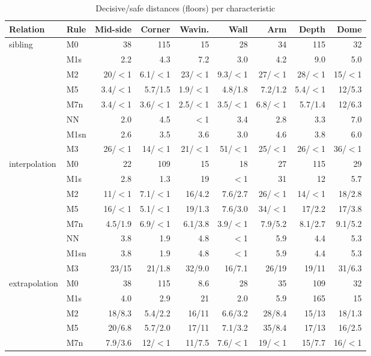\documentclass[pdflatex,sn-basic]{sn-jnl}
\newcommand{\tabsizesmall}{\footnotesize}
\begin{document}
\begin{table}[p]
\tabsizesmall
\setlength{\tabcolsep}{2pt}
\caption{Decisive/safe distances (floors) per characteristic}\label{tab:s-qc}
\begin{tabular}{@{}llrrrrrrr@{}}
\toprule
Relation & Rule & Mid-side & Corner & Wavin. & Wall & Arm & Depth & Dome \\
\midrule
sibling & M0 & 38 & 115 & 15 & 28 & 34 & 115 & 32 \\
 & M1s & 2.2 & 4.3 & 7.2 & 3.0 & 4.2 & 9.0 & 5.0 \\
 & M2 & 20/$<$1 & 6.1/$<$1 & 23/$<$1 & 9.3/$<$1 & 27/$<$1 & 28/$<$1 & 15/$<$1 \\
 & M5 & 3.4/$<$1 & 5.7/1.5 & 1.9/$<$1 & 4.8/1.8 & 7.2/1.2 & 5.4/$<$1 & 12/5.3 \\
 & M7n & 3.4/$<$1 & 3.6/$<$1 & 2.5/$<$1 & 3.5/$<$1 & 6.8/$<$1 & 5.7/1.4 & 12/6.3 \\
 & NN & 2.0 & 4.5 & $<$1 & 3.4 & 2.8 & 3.3 & 7.0 \\
 & M1sn & 2.6 & 3.5 & 3.6 & 3.0 & 4.6 & 3.8 & 6.0 \\
 & M3 & 26/$<$1 & 14/$<$1 & 21/$<$1 & 51/$<$1 & 25/$<$1 & 26/$<$1 & 36/$<$1 \\
interpolation & M0 & 22 & 109 & 15 & 18 & 27 & 115 & 29 \\
 & M1s & 2.8 & 1.3 & 19 & $<$1 & 31 & 12 & 5.7 \\
 & M2 & 11/$<$1 & 7.1/$<$1 & 16/4.2 & 7.6/2.7 & 26/$<$1 & 14/$<$1 & 18/2.8 \\
 & M5 & 16/$<$1 & 5.1/$<$1 & 19/1.3 & 7.6/3.0 & 34/$<$1 & 17/2.2 & 17/3.8 \\
 & M7n & 4.5/1.9 & 6.9/$<$1 & 6.1/3.8 & 3.9/$<$1 & 7.9/5.2 & 8.1/2.7 & 9.1/5.2 \\
 & NN & 3.8 & 1.9 & 4.8 & $<$1 & 5.9 & 4.4 & 5.3 \\
 & M1sn & 3.8 & 1.9 & 4.8 & $<$1 & 5.9 & 4.4 & 5.3 \\
 & M3 & 23/15 & 21/1.8 & 32/9.0 & 16/7.1 & 26/19 & 19/11 & 31/6.3 \\
extrapolation & M0 & 38 & 115 & 8.6 & 28 & 35 & 109 & 32 \\
 & M1s & 4.0 & 2.9 & 21 & 2.0 & 5.9 & 165 & 15 \\
 & M2 & 18/8.3 & 5.4/2.2 & 16/11 & 6.6/3.2 & 28/8.4 & 15/13 & 18/1.3 \\
 & M5 & 20/6.8 & 5.7/2.0 & 17/11 & 7.1/3.2 & 35/8.4 & 17/13 & 16/2.5 \\
 & M7n & 7.9/3.6 & 12/$<$1 & 11/7.5 & 7.6/$<$1 & 19/$<$1 & 15/7.7 & 16/$<$1 \\

\end{tabular}
\end{table}
\end{document}
